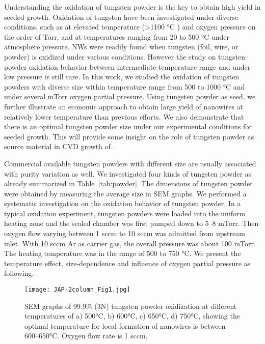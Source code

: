 Understanding the oxidation of tungsten powder is the key to obtain high yield in seeded growth. Oxidation of tungsten have been investigated under diverse conditions, such as at elevated temperature (\textgreater 1100 \si{\degreeCelsius} ) and oxygen pressure on the order of Torr,\cite{Base1965} and at temperatures ranging from 20 to 500 \si{\degreeCelsius} under atmosphere pressure.\cite{Warren1996}  NWs were readily found when tungsten (foil, wire, or powder) is oxidized under various conditions.\cite{Zhu1999,Karuppanan2007,Hsieh2010} However the study on tungsten powder oxidation behavior between intermediate temperature range and under low pressure is still rare. In this work, we studied the oxidation of tungsten powders with diverse size within temperature range from 500 to 1000 \si{\degreeCelsius} and under several mTorr oxygen partial pressure. Using tungsten powder as seed, we further illustrate an economic approach to obtain large yield of  nanowires at relatively lower temperature than previous efforts. We also demonstrate that there is an optimal tungsten powder size under our experimental conditions for seeded growth. This will provide some insight on the role of tungsten powder as source material in CVD growth of .

Commercial available tungsten powders with different size are usually associated with purity variation as well. We investigated four kinds of tungsten powder as already summarized in Table~\ref{tab:powder}. The dimensions of tungsten powder were obtained by measuring the average size in SEM graphs. We performed a systematic investigation on the oxidation behavior of tungsten powder. In a typical oxidation experiment, tungsten powders were loaded into the uniform heating zone and the sealed chamber was first pumped down to 5--8 mTorr. Then oxygen flow varying between 1 sccm to 10 sccm was admitted from upstream inlet. With 10 sccm Ar as carrier gas, the overall pressure was about 100 mTorr. The heating temperature was in the range of 500 to 750 \si{\degreeCelsius}. We present the temperature effect, size-dependence and influence of oxygen partial pressure as following.
\begin{figure}[htb]
\centering
\texttt{[image: JAP-2column\_Fig1.jpg]}
\caption[W powder oxidation: temperature effect]{SEM graphs of 99.9\% (3N) tungsten powder oxidization at different temperatures of a) 500\si{\degreeCelsius}, b) 600\si{\degreeCelsius}, c) 650\si{\degreeCelsius}, d) 750\si{\degreeCelsius}, showing the optimal temperature for local formation of nanowires is between 600--650\si{\degreeCelsius}. Oxygen flow rate is 1 sccm.}
\label{fig:pdtemp}
\end{figure}

